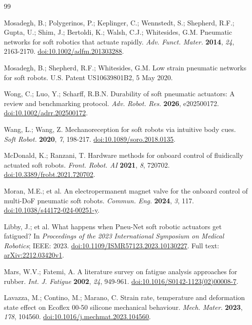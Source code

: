 \documentclass[preprints,article,submit,oneauthor]{Definitions/mdpi}
\begin{document}
\begin{thebibliography}{99}

Mosadegh, B.; Polygerinos, P.; Keplinger, C.; Wennstedt, S.; Shepherd, R.F.; Gupta, U.; Shim, J.; Bertoldi, K.; Walsh, C.J.; Whitesides, G.M. Pneumatic networks for soft robotics that actuate rapidly. \emph{Adv. Funct. Mater.} \textbf{2014}, \emph{24}, 2163-2170. \href{https://doi.org/10.1002/adfm.201303288}{doi:10.1002/adfm.201303288}.

Mosadegh, B.; Shepherd, R.F.; Whitesides, G.M. Low strain pneumatic networks for soft robots. U.S. Patent US10639801B2, 5 May 2020.

Wong, C.; Luo, Y.; Scharff, R.B.N. Durability of soft pneumatic actuators: A review and benchmarking protocol. \emph{Adv. Robot. Res.} \textbf{2026}, e202500172. \href{https://doi.org/10.1002/adrr.202500172}{doi:10.1002/adrr.202500172}.

Wang, L.; Wang, Z. Mechanoreception for soft robots via intuitive body cues. \emph{Soft Robot.} \textbf{2020}, \emph{7}, 198-217. \href{https://doi.org/10.1089/soro.2018.0135}{doi:10.1089/soro.2018.0135}.

McDonald, K.; Ranzani, T. Hardware methods for onboard control of fluidically actuated soft robots. \emph{Front. Robot. AI} \textbf{2021}, \emph{8}, 720702. \href{https://doi.org/10.3389/frobt.2021.720702}{doi:10.3389/frobt.2021.720702}.

Moran, M.E.; et al. An electropermanent magnet valve for the onboard control of multi-DoF pneumatic soft robots. \emph{Commun. Eng.} \textbf{2024}, \emph{3}, 117. \href{https://doi.org/10.1038/s44172-024-00251-y}{doi:10.1038/s44172-024-00251-y}.

Libby, J.; et al. What happens when Pneu-Net soft robotic actuators get fatigued? In \emph{Proceedings of the 2023 International Symposium on Medical Robotics}; IEEE: 2023. \href{https://doi.org/10.1109/ISMR57123.2023.10130227}{doi:10.1109/ISMR57123.2023.10130227}. Full text: \href{https://arxiv.org/pdf/2212.03420v1}{arXiv:2212.03420v1}.

Mars, W.V.; Fatemi, A. A literature survey on fatigue analysis approaches for rubber. \emph{Int. J. Fatigue} \textbf{2002}, \emph{24}, 949-961. \href{https://doi.org/10.1016/S0142-1123(02)00008-7}{doi:10.1016/S0142-1123(02)00008-7}.

Lavazza, M.; Contino, M.; Marano, C. Strain rate, temperature and deformation state effect on Ecoflex 00-50 silicone mechanical behaviour. \emph{Mech. Mater.} \textbf{2023}, \emph{178}, 104560. \href{https://doi.org/10.1016/j.mechmat.2023.104560}{doi:10.1016/j.mechmat.2023.104560}.


\end{thebibliography}
\end{document}
